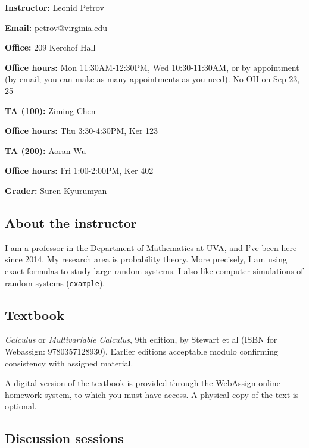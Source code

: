 \documentclass[oneside,11pt]{amsart}
\theoremstyle{definition}
\begin{document}
\parbox{.5\textwidth}{

\textbf{Instructor:} Leonid Petrov

\textbf{Email:} petrov@virginia.edu

\textbf{Office:} 209 Kerchof Hall

\textbf{Office hours:} Mon 11:30AM-12:30PM, Wed 10:30-11:30AM,
or by appointment (by email; you can make as many appointments as you need). No OH on Sep 23, 25}\hspace{30pt}
\parbox{.45\textwidth}{

\textbf{TA (100):} Ziming Chen

\textbf{Office hours:} Thu 3:30-4:30PM, Ker 123

\textbf{TA (200):} Aoran Wu

\textbf{Office hours:} Fri 1:00-2:00PM, Ker 402


\vspace{15pt}

\textbf{Grader:} Suren Kyurumyan}

\vspace{5pt}

\subsection{About the instructor}
I am a professor in the Department of Mathematics at UVA, and I've been here since 2014. My research area is probability theory. More precisely, I am using exact formulas to study large random systems. I also like computer simulations of random systems (\href{https://lpetrov.cc/simulations/2019-04-30-qvol/}{\textcolor{green!70!black}{\texttt{example}}}).

\subsection{Textbook}

\emph{Calculus} or \emph{Multivariable Calculus}, 9th edition, by Stewart et al (ISBN for Webassign: 9780357128930). Earlier editions acceptable modulo confirming consistency with assigned material.

A digital version of the textbook is provided through the WebAssign online homework system, to which you must have access. A physical copy of the text is optional. 

\subsection{Discussion sessions} 
\end{document}
